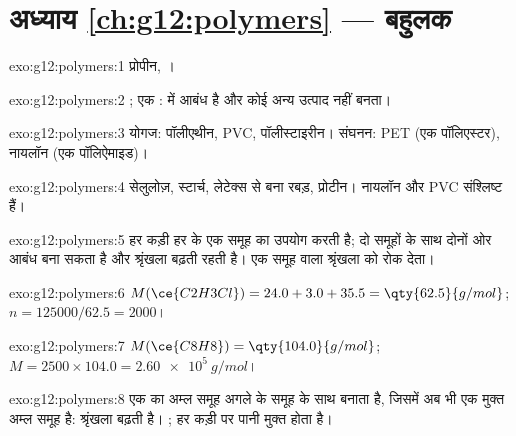 \section*{अध्याय \ref{ch:g12:polymers} --- बहुलक}

\begin{solution}{exo:g12:polymers:1}
प्रोपीन, ।
\end{solution}

\begin{solution}{exo:g12:polymers:2}
; एक :  में  आबंध है और
कोई अन्य उत्पाद नहीं बनता।
\end{solution}

\begin{solution}{exo:g12:polymers:3}
योगज: पॉलीएथीन, PVC, पॉलीस्टाइरीन। संघनन: PET (एक पॉलिएस्टर),
नायलॉन (एक पॉलिऐमाइड)।
\end{solution}

\begin{solution}{exo:g12:polymers:4}
सेलुलोज़, स्टार्च, लेटेक्स से बना रबड़, प्रोटीन। नायलॉन और PVC
संश्लिष्ट हैं।
\end{solution}

\begin{solution}{exo:g12:polymers:5}
हर कड़ी हर  के एक समूह का उपयोग करती है; दो समूहों के साथ 
दोनों ओर आबंध बना सकता है और श्रृंखला बढ़ती रहती है। एक
समूह वाला  श्रृंखला को रोक देता।
\end{solution}

\begin{solution}{exo:g12:polymers:6}
$M(\ce{C2H3Cl}) = 24.0 + 3.0 + 35.5 = \qty{62.5}{g/mol}$;
$n = 125000/62.5 = 2000$।
\end{solution}

\begin{solution}{exo:g12:polymers:7}
$M(\ce{C8H8}) = \qty{104.0}{g/mol}$; $M = 2500 \times 104.0 =
\qty{2.60e5}{g/mol}$।
\end{solution}

\begin{solution}{exo:g12:polymers:8}
एक  का अम्ल समूह अगले  के  समूह के साथ  बनाता है,
जिसमें अब भी एक मुक्त अम्ल समूह है: श्रृंखला बढ़ती है।  ; हर कड़ी पर पानी मुक्त होता है।
\end{solution}

